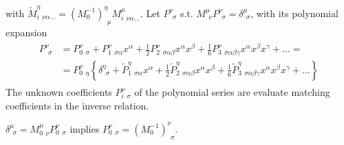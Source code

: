 \documentclass[letterpaper,10pt,english]{jupyterBook}
\begin{document}
\sphinxAtStartPar
with \(\widetilde{M}^{\eta}_{i\ \ \nu \alpha \dots} = \left( M^{-1}_{0} \right)^{\eta}_{\ \ \mu} M^{\mu}_{i\ \ \nu \alpha \dots}\). Let \(P^{\nu}_{\ \ \sigma}\) s.t. \(M^{\mu}_{\ \ \nu} P^{\nu}_{\ \ \sigma} = \delta^{\mu}_{\ \ \sigma}\), with its polynomial expansion
\begin{equation*}
\begin{split}\begin{aligned}
P^{\nu}_{\ \ \sigma} 
& = P^{\nu}_{0 \ \ \sigma} + P^{\nu}_{1\ \ \sigma \alpha} x^\alpha + \frac{1}{2} P^{\nu}_{2\ \ \sigma \alpha \beta} x^\alpha x^\beta + \frac{1}{6} P^{\nu}_{3\ \ \sigma \alpha \beta \gamma} x^\alpha x^\beta x^\gamma + \dots = \\
& = P^{\nu}_{0 \ \ \eta} \left\{ \delta^{\eta}_{\ \ \sigma} + \widetilde{P}^{\eta}_{1\ \ \sigma \alpha} x^\alpha + \frac{1}{2} \widetilde{P}^{\eta}_{2\ \ \sigma \alpha \beta} x^\alpha x^\beta + \frac{1}{6} \widetilde{P}^{\eta}_{3\ \ \sigma \alpha \beta \gamma} x^\alpha x^\beta x^\gamma + \dots \right\}
\end{aligned}\end{split}
\end{equation*}
\sphinxAtStartPar
The unknown coefficients \(P^{\nu}_{i \ \ \sigma}\) of the polynomial series are evaluate matching coefficients in the inverse relation.

\sphinxAtStartPar
{} \(\delta^{\mu}_{\ \ \sigma} = M^{\mu}_{0\ \ \nu} P^{\nu}_{0 \ \ \sigma} \) implies \(P^{\nu}_{0\ \ \sigma} = \left( M_0^{-1} \right)^{\nu}_{\ \ \sigma}\).
\end{document}
